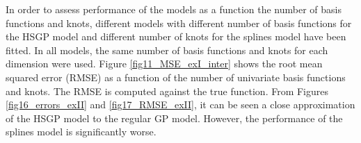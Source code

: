 \documentclass[]{interact}
\theoremstyle{plain}%
\theoremstyle{definition}
\theoremstyle{remark}
\begin{document}
In order to assess performance of the models as a function the number of basis functions and knots, different models with different number of basis functions for the HSGP model and different number of knots for the splines model have been fitted. In all models, the same number of basis functions and knots for each dimension were used. Figure \ref{fig11_MSE_exI_inter} shows the root mean squared error (RMSE) as a function of the number of univariate basis functions and knots. The RMSE is computed against the true function. From Figures \ref{fig16_errors_exII} and \ref{fig17_RMSE_exII}, it can be seen a close approximation of the HSGP model to the regular GP model. However, the performance of the splines model is significantly worse.


\begin{figure}
\centering
{}

\end{figure}
\end{document}
